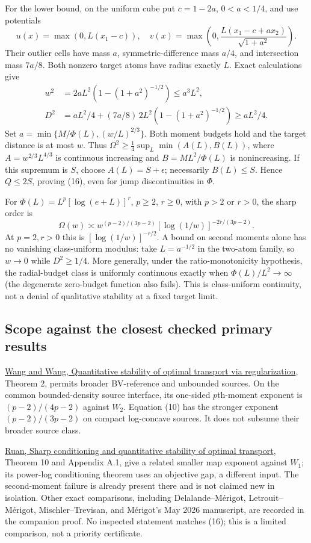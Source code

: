 \documentclass[11pt]{article}
\begin{document}
For the lower bound, on the uniform cube put $c=1-2a$, $0<a<1/4$, and use potentials
\[
u(x)=\max(0,L(x_1-c)),\quad
v(x)=\max\left(0,\frac{L(x_1-c+ax_2)}{\sqrt{1+a^2}}\right).
\]
Their outlier cells have mass $a$, symmetric-difference mass $a/4$, and intersection mass $7a/8$. Both nonzero target atoms have radius exactly $L$. Exact calculations give
\begin{align*}
w^2&=2aL^2(1-(1+a^2)^{-1/2})\le a^3L^2,\\
D^2&=aL^2/4+(7a/8)\,2L^2(1-(1+a^2)^{-1/2})\ge aL^2/4.
\end{align*}
Set $a=\min\{M/\Phi(L),(w/L)^{2/3}\}$. Both moment budgets hold and the target distance is at most $w$. Thus $\Omega^2\ge\frac14\sup_L\min(A(L),B(L))$, where $A=w^{2/3}L^{4/3}$ is continuous increasing and $B=ML^2/\Phi(L)$ is nonincreasing. If this supremum is $S$, choose $A(L)=S+\epsilon$; necessarily $B(L)\le S$. Hence $Q\le2S$, proving (16), even for jump discontinuities in $\Phi$.

For $\Phi(L)=L^p[\log(e+L)]^r$, $p\ge2$, $r\ge0$, with $p>2$ or $r>0$, the sharp order is
\[
\Omega(w)\asymp
w^{(p-2)/(3p-2)}[\log(1/w)]^{-2r/(3p-2)}.
\tag{17}
\]
At $p=2,r>0$ this is $[\log(1/w)]^{-r/2}$. A bound on second moments alone has no vanishing class-uniform modulus: take $L=a^{-1/2}$ in the two-atom family, so $w\to0$ while $D^2\ge1/4$. More generally, under the ratio-monotonicity hypothesis, the radial-budget class is uniformly continuous exactly when $\Phi(L)/L^2\to\infty$ (the degenerate zero-budget function also fails). This is class-uniform continuity, not a denial of qualitative stability at a fixed target limit.

\subsection{Scope against the closest checked primary results}

\href{https://arxiv.org/html/2610.09640v1}{Wang and Wang, Quantitative stability of optimal transport via regularization}, Theorem 2, permits broader BV-reference and unbounded sources. On the common bounded-density source interface, its one-sided $p$th-moment exponent is $(p-2)/(4p-2)$ against $W_2$. Equation (10) has the stronger exponent $(p-2)/(3p-2)$ on compact log-concave sources. It does not subsume their broader source class.

\href{https://arxiv.org/html/2610.07577v1}{Ruan, Sharp conditioning and quantitative stability of optimal transport}, Theorem 10 and Appendix A.1, give a related smaller map exponent against $W_1$; its power-log conditioning theorem uses an objective gap, a different input. The second-moment failure is already present there and is not claimed new in isolation. Other exact comparisons, including Delalande--M\'erigot, Letrouit--M\'erigot, Mischler--Trevisan, and M\'erigot's May 2026 manuscript, are recorded in the companion proof. No inspected statement matches (16); this is a limited comparison, not a priority certificate.
\end{document}
